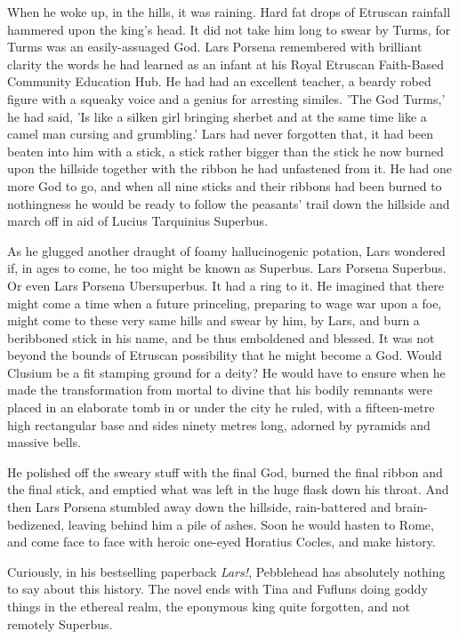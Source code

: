 When he woke up, in the hills, it was raining. Hard fat drops of Etruscan rainfall hammered upon the king's head. It did not take him long to swear by Turms, for Turms was an easily-assuaged God. Lars Porsena remembered with brilliant clarity the words he had learned as an infant at his Royal Etruscan Faith-Based Community Education Hub. He had had an excellent teacher, a beardy robed figure with a squeaky voice and a genius for arresting similes. 'The God Turms,' he had said, 'Is like a silken girl bringing sherbet and at the same time like a camel man cursing and grumbling.' Lars had never forgotten that, it had been beaten into him with a stick, a stick rather bigger than the stick he now burned upon the hillside together with the ribbon he had unfastened from it. He had one more God to go, and when all nine sticks and their ribbons had been burned to nothingness he would be ready to follow the peasants' trail down the hillside and march off in aid of Lucius Tarquinius Superbus.

As he glugged another draught of foamy hallucinogenic potation, Lars wondered if, in ages to come, he too might be known as Superbus. Lars Porsena Superbus. Or even Lars Porsena Ubersuperbus. It had a ring to it. He imagined that there might come a time when a future princeling, preparing to wage war upon a foe, might come to these very same hills and swear by him, by Lars, and burn a beribboned stick in his name, and be thus emboldened and blessed. It was not beyond the bounds of Etruscan possibility that he might become a God. Would Clusium be a fit stamping ground for a deity? He would have to ensure when he made the transformation from mortal to divine that his bodily remnants were placed in an elaborate tomb in or under the city he ruled, with a fifteen-metre high rectangular base and sides ninety metres long, adorned by pyramids and massive bells.

He polished off the sweary stuff with the final God, burned the final ribbon and the final stick, and emptied what was left in the huge flask down his throat. And then Lars Porsena stumbled away down the hillside, rain-battered and brain-bedizened, leaving behind him a pile of ashes. Soon he would hasten to Rome, and come face to face with heroic one-eyed Horatius Cocles, and make history.

Curiously, in his bestselling paperback \emph{Lars!}, Pebblehead has absolutely nothing to say about this history. The novel ends with Tina and Fufluns doing goddy things in the ethereal realm, the eponymous king quite forgotten, and not remotely Superbus.